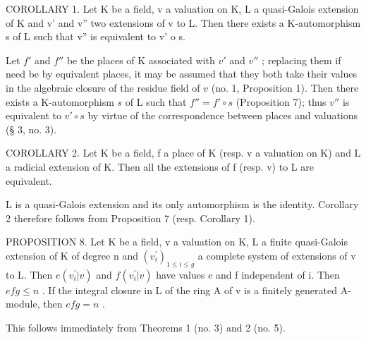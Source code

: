 COROLLARY 1. Let K be a field, v a valuation on K, L a quasi-Galois extension of K and v' and v'' two extensions of v to L. Then there exists a K-automorphism s of L such that v'' is equivalent to v' o s.

Let \(f'\) and \(f''\) be the places of K associated with \(v'\) and \(v''\) ; replacing them if need be by equivalent places, it may be assumed that they both take their values in the algebraic closure of the residue field of \(v\) (no. 1, Proposition 1). Then there exists a K-automorphism \(s\) of L such that \(f'' = f' \circ s\) (Proposition 7); thus \(v''\) is equivalent to \(v' \circ s\) by virtue of the correspondence between places and valuations (§ 3, no. 3).

COROLLARY 2. Let K be a field, f a place of K (resp. v a valuation on K) and L a radicial extension of K. Then all the extensions of f (resp. v) to L are equivalent.

L is a quasi-Galois extension and its only automorphism is the identity. Corollary 2 therefore follows from Proposition 7 (resp. Corollary 1).

PROPOSITION 8. Let K be a field, v a valuation on K, L a finite quasi-Galois extension of K of degree n and \((v_{i}^{\prime})_{1\leq i\leq g}\) a complete system of extensions of v to L. Then \(e(v_{i}^{\prime}|v)\) and \(f(v_{i}^{\prime}|v)\) have values e and f independent of i. Then \(efg \leqslant n\) . If the integral closure in L of the ring A of v is a finitely generated A-module, then \(efg = n\) .

This follows immediately from Theorems 1 (no. 3) and 2 (no. 5).

